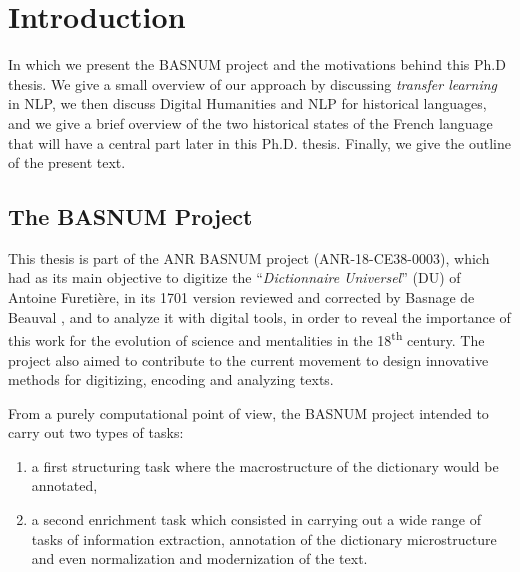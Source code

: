 \chapter{Introduction}

\begin{center}
    \begin{minipage}{0.66\textwidth}
        \begin{small}
            In which we present the BASNUM project and the motivations behind this Ph.D thesis. We give a small overview of our approach by discussing \emph{transfer learning} in NLP, we then discuss Digital Humanities and NLP for historical languages, and we give a brief overview of the two historical states of the French language that will have a central part later in this Ph.D. thesis. Finally, we give the outline of the present text.
        \end{small}
    \end{minipage}
    \vspace{0.5cm}
\end{center}

\section{The BASNUM Project}

This thesis is part of the ANR BASNUM project (ANR-18-CE38-0003), which had as its main objective to digitize the \enquote{\emph{Dictionnaire Universel}} (DU) of Antoine Furetière, in its 1701 version reviewed and corrected by Basnage de Beauval \citep{furetiere-1701-dictionnaire}, and to analyze it with digital tools, in order to reveal the importance of this work for the evolution of science and mentalities in the 18\textsuperscript{th} century. The project also aimed to contribute to the current movement to design innovative methods for digitizing, encoding and analyzing texts.

From a purely computational point of view, the BASNUM project intended to carry out two types of tasks:
\begin{enumerate}
    \item a first structuring task where the macrostructure of the dictionary would be annotated,
    \item a second enrichment task which consisted in carrying out a wide range of tasks of information extraction, annotation of the dictionary microstructure and even normalization and modernization of the text.
\end{enumerate}


